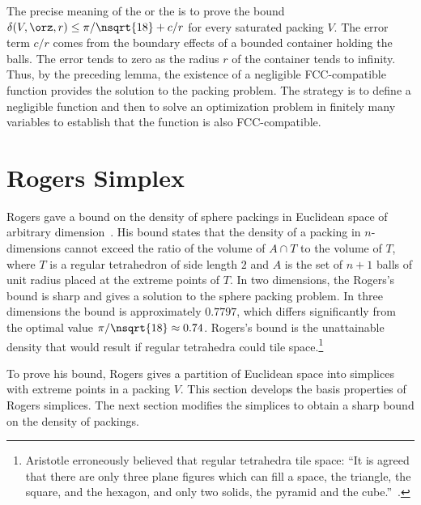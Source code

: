 \begin{cnl}
\begin{remark}
\label{remark:precise} 
The precise meaning of the  or the
 is to prove the bound $\delta(
V,\orz,r) \le \pi/\nsqrt{18} + c/r$ for every saturated packing $ V$.
The error term $c/r$ comes from the boundary effects of a bounded
container holding the balls.  The error tends to zero as the radius
$r$ of the container tends to infinity.  Thus, by the preceding lemma,
the existence of a negligible FCC-compatible function provides the
solution to the packing problem.  The strategy is to define a
negligible function and then to solve an optimization problem in
finitely many variables to establish that the function is also
FCC-compatible.
\end{remark}


\section{Rogers Simplex}\label{sec:rogers}

%
%

Rogers gave a bound on the density of sphere packings in Euclidean
space of arbitrary dimension~\cite{Rogers:1958:Packing}.  His bound
states that the density of a packing in $n$-dimensions cannot exceed
the ratio of the volume of $A \cap T$ to the volume of $T$, where $T$
is a regular tetrahedron of side length $2$ and $A$ is the set of
$n+1$ balls of unit radius placed at the extreme points of $T$.  In two
dimensions, the Rogers's bound is sharp and gives a solution to the
sphere packing problem.  In three dimensions the bound is
approximately $0.7797$, which differs significantly from the optimal
value $\pi/\nsqrt{18}\approx 0.74$.  Rogers's bound is the unattainable
density that would result if regular tetrahedra could tile
space.\footnote{Aristotle erroneously believed that regular tetrahedra
  tile space: ``It is agreed that there are only three plane figures
  which can fill a space, the triangle, the square, and the hexagon,
  and only two solids, the pyramid and the cube.''~\cite{Aristotle}.}
%
%
%

To prove his bound, Rogers gives a partition of Euclidean space into
simplices with extreme points in a packing $V$.  This section develops
the basis properties of Rogers simplices.  The next section modifies
the simplices to obtain a sharp bound on the density of packings.





\end{cnl}
